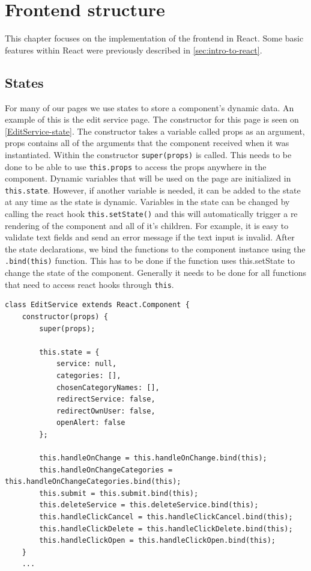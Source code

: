 \section{Frontend structure}
This chapter focuses on the implementation of the frontend in React.
Some basic features within React were previously described in \autoref{sec:intro-to-react}.

\subsection{States}
For many of our pages we use states to store a component's dynamic data. 
An example of this is the edit service page. 
The constructor for this page is seen on \autoref{EditService-state}.
The constructor takes a variable called props as an argument, props contains all of the arguments that the component received when it was instantiated. 
Within the constructor \texttt{super(props)} is called.
This needs to be done to be able to use \texttt{this.props} to access the props anywhere in the component.
Dynamic variables that will be used on the page are initialized in \texttt{this.state}. 
However, if another variable is needed, it can be added to the state at any time as the state is dynamic.
Variables in the state can be changed by calling the react hook \texttt{this.setState()} and this will automatically trigger a re rendering of the component and all of it's children.
For example, it is easy to validate text fields and send an error message if the text input is invalid.  
After the state declarations, we bind the functions to the component instance using the \texttt{.bind(this)} function.
This has to be done if the function uses {this.setState} to change the state of the component.
Generally it needs to be done for all functions that need to access react hooks through \texttt{this}.
\begin{lstlisting}[caption={Constructor and state for edit service}, captionpos=b, label={EditService-state}]
class EditService extends React.Component {
    constructor(props) {
        super(props);
    
        this.state = {
            service: null,
            categories: [],
            chosenCategoryNames: [],
            redirectService: false,
            redirectOwnUser: false,
            openAlert: false
        };
            
        this.handleOnChange = this.handleOnChange.bind(this);
        this.handleOnChangeCategories = this.handleOnChangeCategories.bind(this);
        this.submit = this.submit.bind(this);
        this.deleteService = this.deleteService.bind(this);
        this.handleClickCancel = this.handleClickCancel.bind(this);
        this.handleClickDelete = this.handleClickDelete.bind(this);
        this.handleClickOpen = this.handleClickOpen.bind(this);
    }
    ...
\end{lstlisting}

